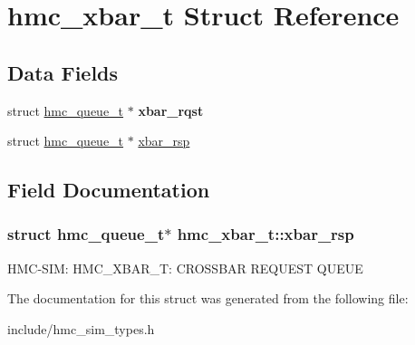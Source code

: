 \hypertarget{structhmc__xbar__t}{\section{hmc\-\_\-xbar\-\_\-t Struct Reference}
\label{structhmc__xbar__t}
}
\subsection*{Data Fields}
\begin{DoxyCompactItemize}
\item 
\hypertarget{structhmc__xbar__t_abd0307092db26c8cb1621f005f56b42b}{struct \hyperlink{structhmc__queue__t}{hmc\-\_\-queue\-\_\-t} $\ast$ {\bfseries xbar\-\_\-rqst}}\label{structhmc__xbar__t_abd0307092db26c8cb1621f005f56b42b}

\item 
struct \hyperlink{structhmc__queue__t}{hmc\-\_\-queue\-\_\-t} $\ast$ \hyperlink{structhmc__xbar__t_a185f527dcc5897dfd4e456964d7a57b9}{xbar\-\_\-rsp}
\end{DoxyCompactItemize}


\subsection{Field Documentation}
\hypertarget{structhmc__xbar__t_a185f527dcc5897dfd4e456964d7a57b9}{
\subsubsection[{xbar\-\_\-rsp}]{\setlength{\rightskip}{0pt plus 5cm}struct {\bf hmc\-\_\-queue\-\_\-t}$\ast$ hmc\-\_\-xbar\-\_\-t\-::xbar\-\_\-rsp}}\label{structhmc__xbar__t_a185f527dcc5897dfd4e456964d7a57b9}
H\-M\-C-\/\-S\-I\-M\-: H\-M\-C\-\_\-\-X\-B\-A\-R\-\_\-\-T\-: C\-R\-O\-S\-S\-B\-A\-R R\-E\-Q\-U\-E\-S\-T Q\-U\-E\-U\-E 

The documentation for this struct was generated from the following file\-:\begin{DoxyCompactItemize}
\item 
include/hmc\-\_\-sim\-\_\-types.\-h\end{DoxyCompactItemize}
